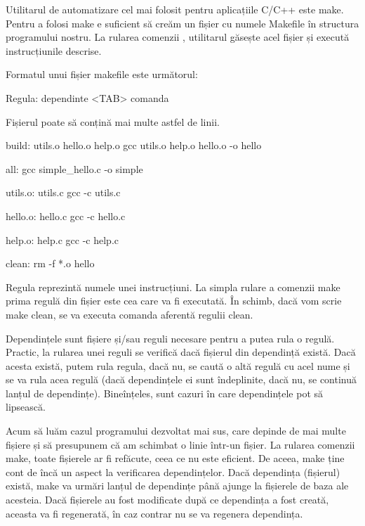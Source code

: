 Utilitarul de automatizare cel mai folosit pentru aplicațiile C/C++ este make.
Pentru a folosi make e suficient să creăm un fișier cu numele Makefile în
structura programului nostru. La rularea comenzii , utilitarul găsește
acel fișier și execută instrucțiunile descrise.

Formatul unui fișier makefile este următorul:

\begin{screen}
Regula: dependinte
<TAB> comanda
\end{screen}

Fișierul poate să conțină mai multe astfel de linii.

\begin{screen}
build: utils.o hello.o help.o
       gcc utils.o help.o hello.o -o hello

all:
       gcc simple_hello.c -o simple

utils.o: utils.c
       gcc -c utils.c

hello.o: hello.c
       gcc -c hello.c

help.o: help.c
       gcc -c help.c

clean:
       rm -f *.o hello
\end{screen}

Regula reprezintă numele unei instrucțiuni. La simpla rulare a comenzii make
prima regulă din fișier este cea care va fi executată. În schimb, dacă vom scrie
make clean, se va executa comanda aferentă regulii clean.

Dependințele sunt fișiere și/sau reguli necesare pentru a putea rula o regulă.
Practic, la rularea unei reguli se verifică dacă fișierul din dependință există.
Dacă acesta există, putem rula regula, dacă nu, se caută o altă regulă cu acel
nume și se va rula acea regulă (dacă dependințele ei sunt îndeplinite, dacă nu,
se continuă lanțul de dependințe). Bineînțeles, sunt cazuri în care dependințele
pot să lipsească.

Acum să luăm cazul programului dezvoltat mai sus, care depinde de mai multe
fișiere și să presupunem că am schimbat o linie într-un fișier. La rularea
comenzii make, toate fișierele ar fi refăcute, ceea ce nu este eficient. De
aceea, make ține cont de încă un aspect la verificarea dependințelor. Dacă
dependința (fișierul) există, make va urmări lanțul de dependințe până ajunge la
fișierele de baza ale acesteia. Dacă fișierele au fost modificate după ce
dependința a fost creată, aceasta va fi regenerată, în caz contrar nu se va
regenera dependința.

